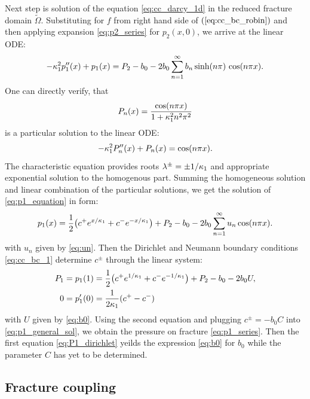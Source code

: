 \documentclass[sn-mathphys,Numbered]{sn-jnl}
\begin{document}
 Next step is solution of the equation \eqref{eq:cc_darcy_1d} in the reduced fracture domain $\tilde \Omega$. 
 Substituting for $f$ from right hand side of $(\ref{eq:cc_bc_robin})$ and then applying expansion \eqref{eq:p2_series} for $p_2(x, 0)$, 
 we arrive at the linear ODE: 
\begin{equation}
    \label{eq:p1_equation}
    -\kappa_1^2 p_1''(x) + p_1 (x) = P_2 - b_0 - 2 b_0 \sum ^{\infty}_{n=1} b_n \sinh(n\pi)\, \cos (n\pi x).
\end{equation}
One can directly verify, that 
\[
    P_n(x) = \frac{\cos(n \pi x)}{1+\kappa_1^2n^2\pi^2}
\]
is a particular solution to the linear ODE:
\[
    - \kappa_1^2 P_n''(x) + P_n(x) = \cos(n \pi x).
\]
The characteristic equation provides roots $\lambda^\pm = \pm 1/\kappa_1$
and appropriate exponential solution to the homogenous part. Summing the
homogeneous solution and linear combination of the particular solutions, we get the solution of \eqref{eq:p1_equation} in form:
\begin {equation}
    \label{eq:p1_general_sol}        
    p_1(x) = \frac{1}{2}\big(c^+ e^{x/\kappa_1} + c^- e^{-x/\kappa_1}\big) + P_2 - b_0 
    - 2 b_0 \sum^{\infty}_{n=1} u_n \cos (n\pi x).
\end {equation}
with $u_n$ given by \eqref{eq:un}. Then the Dirichlet and Neumann boundary conditions \eqref{eq:cc_bc_1} determine $c^\pm$ 
through the linear system:
\begin{align}
\label{eq:P1_dirichlet}
P_1 &= p_1(1) = \frac{1}{2}\big(c^+e^{1/\kappa_1} + c^- e^{-1/\kappa_1}\big) + P_2 - b_0 - 2 b_0 U, \\
0 &= p_1'(0) = \frac{1}{2\kappa_1}(c^+ - c^-) 
\end{align}
with $U$ given by \eqref{eq:b0}. Using the second equation and 
plugging $c^\pm=-b_0C$ into \eqref{eq:p1_general_sol}, 
we obtain the pressure on fracture \eqref{eq:p1_series}.
Then the first equation \eqref{eq:P1_dirichlet} yeilds
the expression  \eqref{eq:b0} for $b_0$ while the parameter 
$C$ has yet to be determined.



\subsection{Fracture coupling}
\label{sec:cont_coupling}
\end{document}
